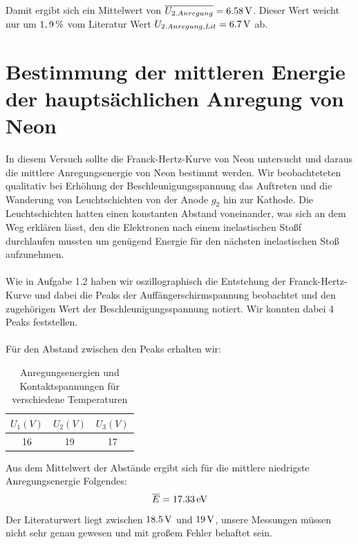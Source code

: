 \documentclass[a4paper,titlepage]{scrartcl}
\numberwithin{equation}{section}
\begin{document}
 Damit ergibt sich ein Mittelwert von $\overline{U_{2.Anregung}}=\unit[6.58]{V} $. Dieser Wert weicht nur um $\unit[1,9]{\%}$ vom Literatur Wert $ U_{2.Anregung,Lit}= \unit[6.7]{V}$ ab.
 
 \section{Bestimmung der mittleren Energie der hauptsächlichen Anregung von Neon}
In diesem Versuch sollte die Franck-Hertz-Kurve von Neon untersucht und daraus die mittlere Anregungsenergie von Neon bestimmt werden. Wir beobachteteten qualitativ bei Erhöhung der Beschleunigungsspannung das Auftreten und die Wanderung von Leuchtschichten von der Anode $g_2$ hin zur Kathode. Die Leuchtschichten hatten einen konstanten Abstand voneinander, was sich an dem Weg erklären lässt, den die Elektronen nach einem inelastischen Stoßf durchlaufen mussten um genügend Energie für den nächsten inelastischen Stoß aufzunehmen.\\ \\
Wie in Aufgabe 1.2 haben wir oszillographisch die Entstehung der Franck-Hertz-Kurve und dabei die Peaks der Auffängerschirmspannung beobachtet und den zugehörigen Wert der Beschleunigungsspannung notiert. Wir konnten dabei 4 Peaks feststellen.\\ \\
Für den Abstand zwischen den Peaks erhalten wir:
\begin{table}[H]
\begin{tabular}{c|c|c}
	$U_1 (V)$ & $U_2 (V)$ & $U_3 (V)$ \\
	\hline
	16 & 19 & 17 \\
\end{tabular}
\caption{Anregungsenergien und Kontaktspannungen für verschiedene Temperaturen}
\label{tab:aufgabe3}
\end{table}
Aus dem Mittelwert der Abstände ergibt sich für die mittlere niedrigste Anregungsenergie Folgendes:
\begin{equation}
\overline{E}=\unit[17.33]{eV}
\end{equation}
Der Literaturwert liegt zwischen $\unit[18.5]{V}$ und $\unit[19]{V}$, unsere Messungen müssen nicht sehr genau gewesen und mit großem Fehler behaftet sein.
\end{document}

